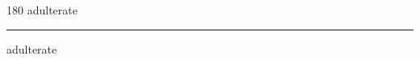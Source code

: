 
\begin{frame}
\begin{center}
\begin{turn}{180}
{\fontsize{2.5cm}{1em}\selectfont adulterate}
\end{turn}
\vspace{1em}\par  
\hrule
\vspace{1em}\par  
{\fontsize{2.5cm}{1em}\selectfont adulterate}
\end{center}
\end{frame}
